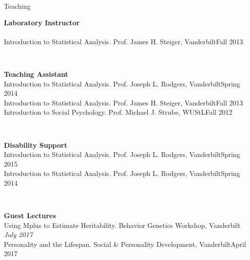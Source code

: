 \begin{rSection}{\textrm{Teaching}}
\begin{minipage}{\linewidth}{\large {\bf Laboratory Instructor}\\}
\smallskip\\
Introduction to Statistical Analysis. Prof. James H. Steiger, Vanderbilt\hfill  {Fall 2013}%
\end{minipage}
\medskip\\
\begin{minipage}{\linewidth}{\large {\bf Teaching Assistant}}\\
Introduction to Statistical Analysis. Prof. Joseph L. Rodgers, Vanderbilt\hfill  {Spring 2014}\smallskip\\
Introduction to Statistical Analysis. Prof. James H. Steiger, Vanderbilt\hfill  {Fall 2013}\smallskip\\
Introduction to Social Psychology. Prof. Michael J. Strube, WUStL\hfill{Fall 2012}\end{minipage}\medskip\\
\begin{minipage}{\linewidth}{\large {\bf Disability Support}}\\
Introduction to Statistical Analysis. Prof. Joseph L. Rodgers, Vanderbilt\hfill  {Spring 2015}\smallskip\\
Introduction to Statistical Analysis. Prof. Joseph L. Rodgers, Vanderbilt\hfill{Spring 2014}\end{minipage}\medskip\\
\begin{minipage}{\linewidth}{\large {\bf Guest Lectures}}\\
Using Mplus to Estimate Heritability. Behavior Genetics Workshop, Vanderbilt \hfill{\textit{July 2017}}\\
Personality and the Lifespan. Social \& Personality Development, Vanderbilt\hfill {April 2017}\end{minipage}
\end{rSection}
